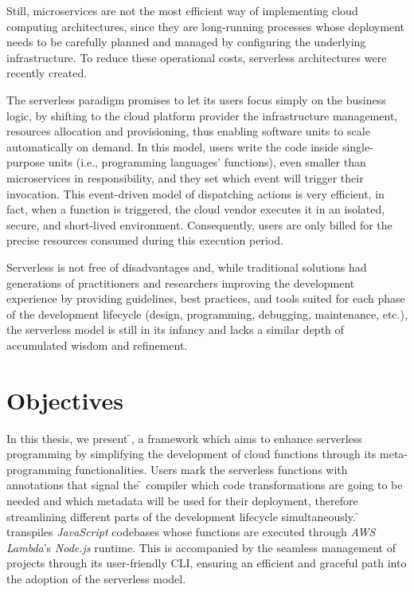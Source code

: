 Still, microservices are not the most efficient way of implementing cloud computing architectures,
since they are long-running processes whose deployment needs to be carefully planned and managed
by configuring the underlying infrastructure. To reduce these operational costs,
serverless architectures were recently created.

The serverless paradigm promises to let its users focus simply on the business logic,
by shifting to the cloud platform provider the infrastructure management,
resources allocation and provisioning, thus enabling software units to scale automatically on demand.
In this model, users write the code inside single-purpose units (i.e., programming languages' functions),
even smaller than microservices in responsibility,
and they set which event will trigger their invocation.
This event-driven model of dispatching actions is very efficient, in fact,
when a function is triggered, the cloud vendor executes it in an isolated, secure, and short-lived environment.
Consequently, users are only billed for the precise resources consumed during this execution period.

Serverless is not free of disadvantages and, while traditional solutions
had generations of practitioners and researchers improving the development experience
by providing guidelines, best practices, and tools suited for each phase
of the development lifecycle (design, programming, debugging, maintenance, etc.),
the serverless model is still in its infancy and lacks a similar depth of accumulated wisdom and refinement.

\section{Objectives} %

In this thesis, we present \f{}, a framework which aims to enhance serverless programming
by simplifying the development of cloud functions through its meta-programming functionalities.
Users mark the serverless functions with annotations that signal the \f{} compiler
which code transformations are going to be needed and which metadata will be used
for their deployment, therefore streamlining different parts of the development lifecycle simultaneously.
\f{} transpiles \textit{JavaScript} codebases whose functions are executed
through \textit{AWS Lambda}'s \textit{Node.js} runtime.
This is accompanied by the seamless management of projects
through its user-friendly CLI, ensuring an efficient and graceful path
into the adoption of the serverless model.
